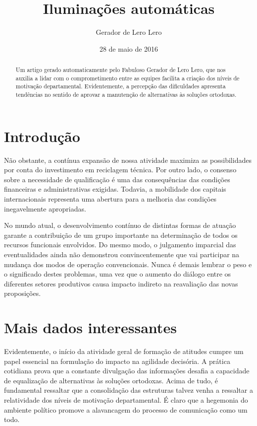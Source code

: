 \documentclass[oneside,twocolumn,a4paper]{article}
\title{Iluminações automáticas}
\author{Gerador de Lero Lero}
\date{28 de maio de 2016}
\begin{document}
\frenchspacing

\maketitle

\begin{abstract}
Um artigo gerado automaticamente pelo Fabuloso Gerador de Lero Lero, que nos
auxilia a lidar com o comprometimento entre as equipes facilita a criação dos
níveis de motivação departamental. Evidentemente, a percepção das dificuldades
apresenta tendências no sentido de aprovar a manutenção de alternativas às
soluções ortodoxas. 
\end{abstract}

\section{Introdução}

Não obstante, a contínua expansão de nossa atividade maximiza as possibilidades
por conta do investimento em reciclagem técnica. Por outro lado, o consenso
sobre a necessidade de qualificação é uma das consequências das condições
financeiras e administrativas exigidas. Todavia, a mobilidade dos capitais
internacionais representa uma abertura para a melhoria das condições
inegavelmente apropriadas.

No mundo atual, o desenvolvimento contínuo de distintas formas de atuação
garante a contribuição de um grupo importante na determinação de todos os
recursos funcionais envolvidos. Do mesmo modo, o julgamento imparcial das
eventualidades ainda não demonstrou convincentemente que vai participar na
mudança dos modos de operação convencionais. Nunca é demais lembrar o peso e o
significado destes problemas, uma vez que o aumento do diálogo entre os
diferentes setores produtivos causa impacto indireto na reavaliação das novas
proposições.

\section{Mais dados interessantes}

Evidentemente, o início da atividade geral de formação de atitudes cumpre um
papel essencial na formulação do impacto na agilidade decisória. A prática
cotidiana prova que a constante divulgação das informações desafia a capacidade
de equalização de alternativas às soluções ortodoxas. Acima de tudo, é
fundamental ressaltar que a consolidação das estruturas talvez venha a
ressaltar a relatividade dos níveis de motivação departamental. É claro que a
hegemonia do ambiente político promove a alavancagem do processo de comunicação
como um todo.
\end{document}
